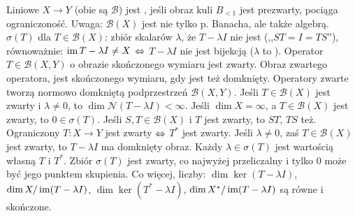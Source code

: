 Liniowe  $X \to Y$ (obie są $\mathscr B$) jest , jeśli obraz kuli $B_{< 1}$ jest prezwarty, pociąga ograniczoność.
Uwaga: $\mathcal B(X)$ jest nie tylko p. Banacha, ale także algebrą.
 $\sigma(T)$ dla $T \in \mathcal B(X)$: zbiór skalarów $\lambda$, że $T - \lambda I$ nie jest  (,,$ST = I = TS$''), równoważnie: $\operatorname{im} T - \lambda I \neq X$ $\Leftrightarrow$ $T - \lambda I$ nie jest bijekcją ($\lambda$ to ).
Operator $T \in \mathcal B(X, Y)$ o obrazie skończonego wymiaru jest zwarty.
Obraz zwartego operatora, jest skończonego wymiaru, gdy jest też domknięty.
Operatory zwarte tworzą normowo domkniętą podprzestrzeń $\mathcal B(X, Y)$.
Jeśli $T \in \mathcal B(X)$ jest zwarty i $\lambda \neq 0$, to $\dim \mathcal N(T - \lambda I) < \infty$.
Jeśli $\dim X = \infty$, a $T \in \mathcal B(X)$ jest zwarty, to $0 \in \sigma(T)$.
Jeśli $S,T \in \mathcal B(X)$ i $T$ jest zwarty, to $ST$, $TS$ też.
Ograniczony $T \colon X \to Y$ jest zwarty $\Leftrightarrow$ $T^*$ jest zwarty.
Jeśli $\lambda \neq 0$, zaś $T \in \mathcal B(X)$ jest zwarty, to $T - \lambda I$ ma domknięty obraz.
Każdy $\lambda \in \sigma(T)$ jest wartością własną $T$ i $T^*$.
Zbiór $\sigma(T)$ jest zwarty, co najwyżej przeliczalny i tylko $0$ może być jego punktem skupienia.
Co więcej, liczby: $\dim \ker (T - \lambda I)$, $\dim X / \operatorname{im} (T - \lambda I)$, $\dim \ker (T^* - \lambda I)$, $\dim X^* / \operatorname{im} (T - \lambda I)$ są równe i skończone.

